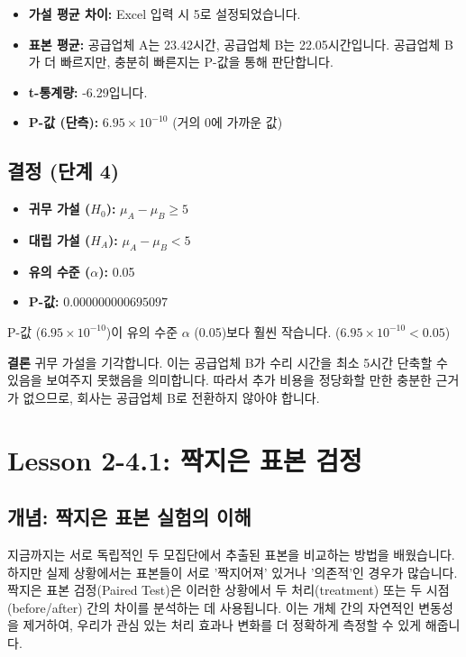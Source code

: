 \documentclass[11pt,a4paper]{article}
\begin{document}
\begin{itemize}
    \item \textbf{가설 평균 차이:} Excel 입력 시 5로 설정되었습니다.
    \item \textbf{표본 평균:} 공급업체 A는 23.42시간, 공급업체 B는 22.05시간입니다. 공급업체 B가 더 빠르지만, 충분히 빠른지는 P-값을 통해 판단합니다.
    \item \textbf{t-통계량:} -6.29입니다.
    \item \textbf{P-값 (단측):} $6.95 \times 10^{-10}$ (거의 0에 가까운 값)
\end{itemize}

\subsection*{결정 (단계 4)}
\begin{itemize}
    \item \textbf{귀무 가설 ($H_0$):} $\mu_A - \mu_B \ge 5$
    \item \textbf{대립 가설 ($H_A$):} $\mu_A - \mu_B < 5$
    \item \textbf{유의 수준 ($\alpha$):} 0.05
    \item \textbf{P-값:} $0.000000000695097$
\end{itemize}
P-값 ($6.95 \times 10^{-10}$)이 유의 수준 $\alpha$ (0.05)보다 훨씬 작습니다.
($6.95 \times 10^{-10} < 0.05$)

\begin{summarybox}
\textbf{결론}
귀무 가설을 기각합니다. 이는 공급업체 B가 수리 시간을 최소 5시간 단축할 수 있음을 보여주지 못했음을 의미합니다. 따라서 추가 비용을 정당화할 만한 충분한 근거가 없으므로, 회사는 공급업체 B로 전환하지 않아야 합니다.
\end{summarybox}

\newpage
\section*{Lesson 2-4.1: 짝지은 표본 검정}

\subsection*{개념: 짝지은 표본 실험의 이해}
지금까지는 서로 독립적인 두 모집단에서 추출된 표본을 비교하는 방법을 배웠습니다. 하지만 실제 상황에서는 표본들이 서로 '짝지어져' 있거나 '의존적'인 경우가 많습니다. 짝지은 표본 검정(Paired Test)은 이러한 상황에서 두 처리(treatment) 또는 두 시점(before/after) 간의 차이를 분석하는 데 사용됩니다. 이는 개체 간의 자연적인 변동성을 제거하여, 우리가 관심 있는 처리 효과나 변화를 더 정확하게 측정할 수 있게 해줍니다.
\end{document}
